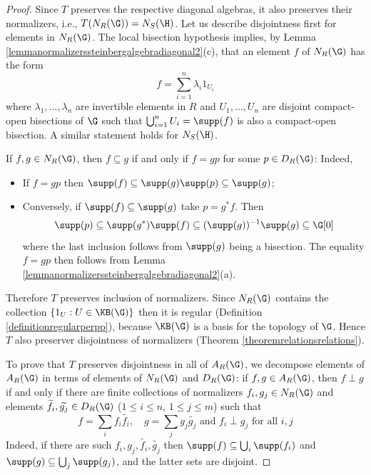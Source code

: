 \begin{proof}
Since $T$ preserves the respective diagonal algebras, it also preserves their normalizers, i.e., $T(N_R(\G))=N_S(\H)$. Let us describe disjointness first for elements in $N_R(\G)$. The local bisection hypothesis implies, by Lemma \ref{lemmanormalizerssteinbergalgebradiagonal2}(c), that an element $f$ of $N_R(\G)$ has the form
\[f=\sum_{i=1}^n\lambda_i1_{U_i}\]
where $\lambda_1,\ldots,\lambda_n$ are invertible elements in $R$ and $U_1,\ldots,U_n$ are disjoint compact-open bisections of $\G$ such that $\bigcup_{i=1}^n U_i=\supp(f)$ is also a compact-open bisection. A similar statement holds for $N_S(\H)$.

If $f,g\in N_R(\G)$, then $f\subseteq g$ if and only if $f=g p$ for some $p\in D_R(\G)$: Indeed,
\begin{itemize}
\item If $f=gp$ then $\supp(f)\subseteq\supp(g)\supp(p)\subseteq\supp(g)$;
\item Conversely, if $\supp(f)\subseteq\supp(g)$ take $p=g^*f$. Then
\[\supp(p)\subseteq\supp(g^*)\supp(f)\subseteq(\supp(g))^{-1}\supp(g)\subseteq\G[0]\]
where the last inclusion follows from $\supp(g)$ being a bisection. The equality $f=gp$ then follows from Lemma \ref{lemmanormalizerssteinbergalgebradiagonal2}(a).
\end{itemize}

Therefore $T$ preserves inclusion of normalizers. Since $N_R(\G)$ contains the collection $\left\{1_U:U\in\KB(\G)\right\}$ then it is regular (Definition \ref{definitionregularperpp}), because $\KB(\G)$ is a basis for the topology of $\G$. Hence $T$ also preserver disjointness of normalizers (Theorem \ref{theoremrelationsrelations}).

To prove that $T$ preserves disjointness in all of $A_R(\G)$, we decompose elements of $A_R(\G)$ in terms of elements of $N_R(\G)$ and $D_R(\G)$: if $f,g\in A_R(\G)$, then $f\perp g$ if and only if there are finite collections of normalizers $f_i,g_j\in N_R(\G)$ and elements $\widetilde{f_i},\widetilde{g_j}\in D_R(\G)$ ($1\leq i\leq n$, $1\leq j\leq m$) such that
\[f=\sum_i f_i\widetilde{f_i},\quad g=\sum_j g_j\widetilde{g_j}\text{ and }f_i\perp g_j\text{ for all }i,j\]
Indeed, if there are such $f_i,g_j,\widetilde{f_i},\widetilde{g_j}$ then $\supp(f)\subseteq\bigcup_i\supp(f_i)$ and $\supp(g)\subseteq\bigcup_j\supp(g_j)$, and the latter sets are disjoint.


\end{proof}

